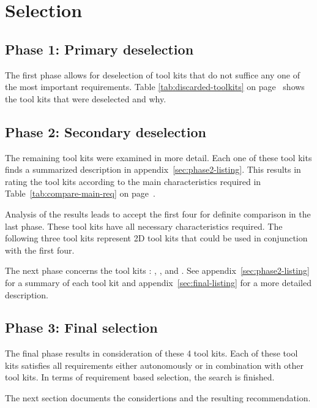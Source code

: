 \section{Selection}

\subsection{Phase 1: Primary deselection}

The first phase allows for deselection of tool kits that do not suffice any one
of the most important requirements.  Table \ref{tab:discarded-toolkits} on
page~\pageref{tab:discarded-toolkits} shows the tool kits that were deselected
and why.

\subsection{Phase 2: Secondary deselection}

The remaining tool kits were examined in more detail. Each one of these tool
kits finds a summarized description in appendix~\ref{sec:phase2-listing}.  This
results in rating the tool kits according to the main characteristics required
in Table~\ref{tab:compare-main-req} on page~\pageref{tab:compare-main-req}.

Analysis of the results leads to accept the first four for definite 
comparison in the last phase. These tool kits have all necessary
characteristics required. The following three tool kits represent
2D tool kits that could be used in conjunction with the first four.

The next phase concerns the tool kits : , ,  and
. See appendix~\ref{sec:phase2-listing} for a summary of each tool kit
and appendix~\ref{sec:final-listing} for a more detailed description.

\subsection{Phase 3: Final selection}

The final phase results in consideration of these 4 tool kits. Each of these
tool kits satisfies all requirements either autonomously or in combination with
other tool kits. In terms of requirement based selection, the search is
finished.

The next section documents the considertions and the resulting recommendation.

